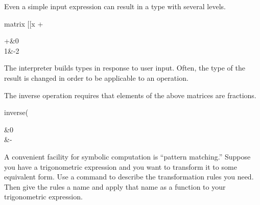%
\begin{xtc}
\begin{xtccomment}
Even a simple input expression can
result in a type with several levels.
\end{xtccomment}
\begin{spadsrc}
matrix [[x + %
\end{spadsrc}
\begin{TeXOutput}
\begin{fricasmath}{1}
\begin{MATRIX}{2}+\ImaginaryI &0\\1&-{2}\end{MATRIX}%
\end{fricasmath}
\end{TeXOutput}
\end{xtc}

The \Language{} interpreter builds types in response to user
input.
Often, the type of the result is changed in order to be applicable
to an operation.

%
\begin{xtc}
\begin{xtccomment}
The inverse operation requires that elements of the above matrices
are fractions.
\end{xtccomment}
\begin{spadsrc}
inverse(%
\end{spadsrc}
\begin{TeXOutput}
\begin{fricasmath}{2}
\begin{MATRIX}{2}&0\\&-{}\end{MATRIX}%
\end{fricasmath}
\end{TeXOutput}
\end{xtc}


A convenient facility for symbolic computation is ``pattern
matching.''
Suppose you have a trigonometric expression and you want to
transform it to some equivalent form.
Use a  command to describe the transformation rules you
need.
Then give the rules a name and apply that name as a function to
your trigonometric expression.

